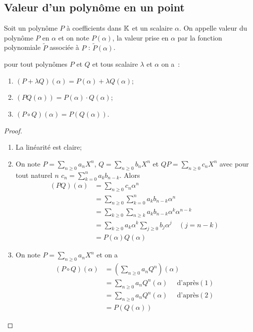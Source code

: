 \subsection{Valeur d'un polynôme en un point}

\begin{defdef}
  Soit un polynôme \(P\) à coefficients dans \(\mathbb{K}\) et un scalaire \(\alpha\). On appelle valeur du polynôme \(P\) en \(\alpha\) et on note \(P(\alpha)\), la valeur prise en \(\alpha\) par la fonction polynomiale \(\widetilde{P}\) associée à \(P\) : \(\widetilde{P}(\alpha)\).
\end{defdef}

\begin{prop}
  pour tout polynômes \(P\) et \(Q\) et tous scalaire \(\lambda\) et \(\alpha\) on a~:
  \begin{enumerate}
    \item \((P+\lambda Q)(\alpha)=P(\alpha) + \lambda Q(\alpha)\);
    \item \((PQ(\alpha))=P(\alpha) \cdot Q(\alpha)\);
    \item \((P \circ Q)(\alpha) = P(Q(\alpha))\).
  \end{enumerate}
\end{prop}
\begin{proof}
  \begin{enumerate}
    \item La linéarité est claire;
    \item On note \(P=\sum_{n \geqslant 0}a_n X^n\), \(Q=\sum_{n \geqslant 0}b_n X^n\) et \(QP=\sum_{n \geqslant 0}c_n X^n\) avec pour tout naturel \(n\) \(c_n = \sum_{k=0}^n a_kb_{n-k}\). Alors
      \begin{align}
        (PQ)(\alpha)&=\sum_{n \geqslant 0}c_n \alpha^n \\
                    &=\sum_{n \geqslant 0} \sum_{k=0}^n a_k b_{n-k} \alpha^n\\
                    &=\sum_{k \geqslant 0} \sum_{n \geqslant k} a_k b_{n-k} \alpha^k \alpha^{n-k}\\
                    &=\sum_{k \geqslant 0}  a_k  \alpha^k \sum_{j \geqslant 0} b_j \alpha^j \quad (j=n-k)\\
                    &=P(\alpha) Q(\alpha)
      \end{align}
    \item On note \(P=\sum_{n \geqslant 0}a_n X^n\) et on a
      \begin{align}
        (P \circ Q)(\alpha) &= \left(\sum_{n \geqslant 0} a_n Q^n \right)(\alpha)\\
                            &= \sum_{n \geqslant 0} a_n Q^n(\alpha) \quad \text{~d'après} (1)\\
                            &= \sum_{n \geqslant 0} a_n Q^n(\alpha) \quad \text{~d'après} (2)\\
                            &= P(Q(\alpha))
      \end{align}
  \end{enumerate}
\end{proof}

